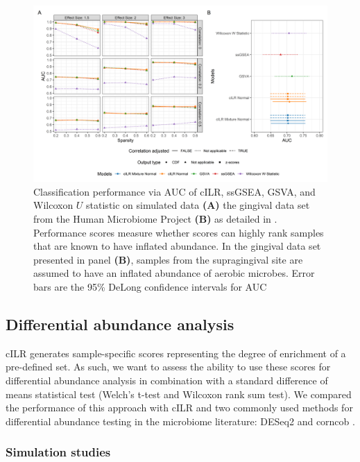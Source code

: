 \documentclass[10pt,letterpaper]{article}
\begin{document}
\begin{figure}[!ht]
    \centering
    \includegraphics[width = \textwidth]{figures/sim_data_ss_auc.png}
    \caption{Classification performance via AUC of cILR, ssGSEA, GSVA, and Wilcoxon $U$ statistic on simulated data \textbf{(A)} the gingival data set from the Human Microbiome Project  \textbf{(B)} as detailed in . Performance scores measure whether scores can highly rank samples that are known to have inflated abundance. In the gingival data set presented in panel \textbf{(B)}, samples from the supragingival site are assumed to have an inflated abundance of aerobic microbes. Error bars are the 95\% DeLong confidence intervals for AUC \cite{delong1988}} 
    \label{fig:3}
\end{figure}

\subsection*{Differential abundance analysis}
cILR generates sample-specific scores representing the degree of enrichment of a pre-defined set. As such, we want to assess the ability to use these scores for differential abundance analysis in combination with a standard difference of means statistical test (Welch's t-test and Wilcoxon rank sum test). We compared the performance of this approach with cILR and two commonly used methods for differential abundance testing in the microbiome literature: DESeq2 \cite{love2014} and corncob \cite{martin2020}.   

\subsubsection*{Simulation studies}
\end{document}
